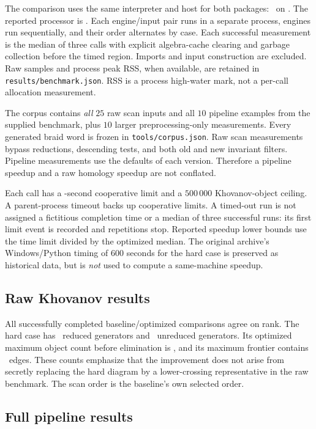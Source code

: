 \documentclass[11pt]{article}
\theoremstyle{remark}\newtheorem{remark}[theorem]{Remark}
\newcommand{\code}[1]{\texttt{\small #1}}
\begin{document}
The comparison uses the same interpreter and host for both packages:
\PythonVersion\ on \HostPlatform. The reported processor is
\CpuModel. Each engine/input pair runs in a separate process, engines
run sequentially, and their order alternates by case. Each successful
measurement is the median of three calls with explicit algebra-cache
clearing and garbage collection before the timed region. Imports and input
construction are excluded. Raw samples and process peak RSS, when available,
are retained in \code{results/benchmark.json}. RSS is a process high-water
mark, not a per-call allocation measurement.

The corpus contains \emph{all} $25$ raw scan inputs and all $10$ pipeline
examples from the supplied benchmark, plus $10$ larger preprocessing-only
measurements. Every generated braid word is frozen in
\code{tools/corpus.json}. Raw scan measurements bypass reductions,
descending tests, and both old and new invariant filters. Pipeline
measurements use the defaults of each version. Therefore a pipeline
speedup and a raw homology speedup are not conflated.

Each call has a \TimeLimit-second cooperative limit and a $500\,000$
Khovanov-object ceiling. A parent-process timeout backs up cooperative
limits. A timed-out run is not assigned a fictitious completion time or a
median of three successful runs: its first limit event is recorded and
repetitions stop. Reported speedup lower bounds use the time limit divided
by the optimized median. The original archive's Windows/Python timing of
$600$ seconds for the hard case is preserved as historical data, but is
\emph{not} used to compute a same-machine speedup.

\subsection{Raw Khovanov results}


All successfully completed baseline/optimized comparisons agree on rank.
The hard case has \HardRank\ reduced generators and \HardUnreduced\
unreduced generators. Its optimized maximum object count before elimination
is \HardPeakObjects, and its maximum frontier contains \HardWidth\ edges.
These counts emphasize that the improvement does not arise from secretly
replacing the hard diagram by a lower-crossing representative in the raw
benchmark. The scan order is the baseline's own selected order.

\subsection{Full pipeline results}
\end{document}
